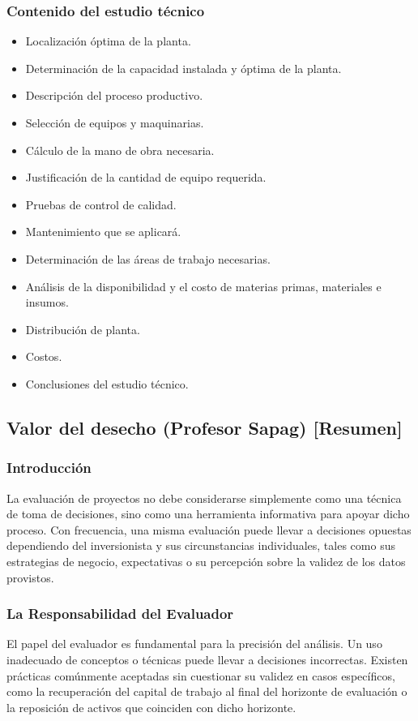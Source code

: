 \documentclass{templateNote}
\begin{document}
\subsubsection{Contenido del estudio técnico}
\begin{itemize}
    \item Localización óptima de la planta.
    \item Determinación de la capacidad instalada y óptima de la planta.
    \item Descripción del proceso productivo.
    \item Selección de equipos y maquinarias.
    \item Cálculo de la mano de obra necesaria.
    \item Justificación de la cantidad de equipo requerida.
    \item Pruebas de control de calidad.
    \item Mantenimiento que se aplicará.
    \item Determinación de las áreas de trabajo necesarias.
    \item Análisis de la disponibilidad y el costo de materias primas, materiales e insumos.
    \item Distribución de planta.
    \item Costos.
    \item Conclusiones del estudio técnico.
\end{itemize}

\newpage
\subsection{Valor del desecho (Profesor Sapag) [Resumen]}

\subsubsection*{Introducción}
La evaluación de proyectos no debe considerarse simplemente como una técnica de toma de decisiones, sino como una herramienta informativa para apoyar dicho proceso. Con frecuencia, una misma evaluación puede llevar a decisiones opuestas dependiendo del inversionista y sus circunstancias individuales, tales como sus estrategias de negocio, expectativas o su percepción sobre la validez de los datos provistos.

\subsubsection*{La Responsabilidad del Evaluador}
El papel del evaluador es fundamental para la precisión del análisis. Un uso inadecuado de conceptos o técnicas puede llevar a decisiones incorrectas. Existen prácticas comúnmente aceptadas sin cuestionar su validez en casos específicos, como la recuperación del capital de trabajo al final del horizonte de evaluación o la reposición de activos que coinciden con dicho horizonte.
\end{document}
